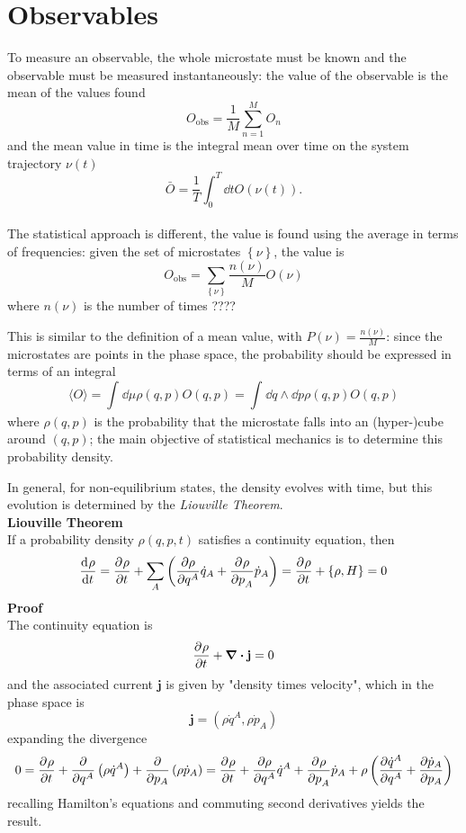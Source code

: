 \section{Observables}
To measure an observable, the whole microstate must be known and the observable must
be measured instantaneously: the value of the observable is the mean of the values
found
$$O_\text{obs} = \frac{1}{M}\sum_{n=1}^{M}O_n$$
and the mean value in time is the integral mean over time on the system trajectory 
$\nu(t)$
$$\bar O = \frac{1}{T}\int_{0}^{T}\dd t O(\nu(t)).$$\\

The statistical approach is different, the value is found using the average in terms
of frequencies: given the set of microstates $\left\{\nu\right\}$, the value is
$$O_\text{obs} = \sum_{\left\{\nu\right\}}^{} \frac{n(\nu)}{M}O(\nu)$$
where $n(\nu)$ is the number of times ????

This is similar to the definition of a mean value, with $P(\nu) = \frac{n(\nu)}{M}$:
since the microstates are points in the phase space, the probability should be
expressed in terms of an integral
$$\langle O\rangle = \int_{}^{}\dd\mu \rho(q,p)O(q,p)=\int_{}^{}\dd q\land\dd p
\rho(q,p)O(q,p)$$
where $\rho(q,p)$ is the probability that the microstate falls into an (hyper-)cube
around $(q,p)$; the main objective of statistical mechanics is to determine this
probability density.

In general, for non-equilibrium states, the density evolves with time, but this
evolution is determined by the \textit{Liouville Theorem}.\\
\textbf{Liouville Theorem}\\
If a probability density $\rho(q,p,t)$ satisfies a continuity equation, then
$$\dv[]{\rho}{t} = \pdv[]{\rho}{t} + \sum_{A}^{}\left(\pdv{\rho}{q^A}\dot q_A +
\pdv[]{\rho}{p_A}\dot p_A\right)=\pdv[]{\rho}{t}+\left\{\rho,H\right\}=0$$
\textbf{Proof}\\
The continuity equation is
$$\pdv[]{\rho}{t} + \divergence\mathbf{j}=0$$
and the associated current $\mathbf{j}$ is given by "density times velocity", which
in the phase space is
$$\mathbf{j} = \left(\rho\dot q^A,\rho\dot p_A\right)$$
expanding the divergence
$$0=\pdv[]{\rho}{t} + \pdv{}{q^A}\left(\rho\dot q^A\right)+\pdv{}{p_A} \left(\rho\dot
p_A\right) = \pdv[]{\rho}{t}+ \pdv{\rho}{q^A}\dot q^A + \pdv[]{\rho}{p_A}\dot p_A +
\rho\left(\pdv{\dot q^A}{q^A} + \pdv{\dot p_A}{p_A}\right)$$
recalling Hamilton's equations and commuting second derivatives yields the result.
